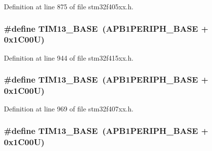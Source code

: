 Definition at line 875 of file stm32f405xx.\+h.

\subsubsection[{\texorpdfstring{T\+I\+M13\+\_\+\+B\+A\+SE}{TIM13_BASE}}]{\setlength{\rightskip}{0pt plus 5cm}\#define T\+I\+M13\+\_\+\+B\+A\+SE~({\bf A\+P\+B1\+P\+E\+R\+I\+P\+H\+\_\+\+B\+A\+SE} + 0x1\+C00\+U)}\hypertarget{group___peripheral__registers__structures_gad20f79948e9359125a40bbf6ed063590}{}\label{group___peripheral__registers__structures_gad20f79948e9359125a40bbf6ed063590}


Definition at line 944 of file stm32f415xx.\+h.

\subsubsection[{\texorpdfstring{T\+I\+M13\+\_\+\+B\+A\+SE}{TIM13_BASE}}]{\setlength{\rightskip}{0pt plus 5cm}\#define T\+I\+M13\+\_\+\+B\+A\+SE~({\bf A\+P\+B1\+P\+E\+R\+I\+P\+H\+\_\+\+B\+A\+SE} + 0x1\+C00\+U)}\hypertarget{group___peripheral__registers__structures_gad20f79948e9359125a40bbf6ed063590}{}\label{group___peripheral__registers__structures_gad20f79948e9359125a40bbf6ed063590}


Definition at line 969 of file stm32f407xx.\+h.

\subsubsection[{\texorpdfstring{T\+I\+M13\+\_\+\+B\+A\+SE}{TIM13_BASE}}]{\setlength{\rightskip}{0pt plus 5cm}\#define T\+I\+M13\+\_\+\+B\+A\+SE~({\bf A\+P\+B1\+P\+E\+R\+I\+P\+H\+\_\+\+B\+A\+SE} + 0x1\+C00\+U)}\hypertarget{group___peripheral__registers__structures_gad20f79948e9359125a40bbf6ed063590}{}\label{group___peripheral__registers__structures_gad20f79948e9359125a40bbf6ed063590}


